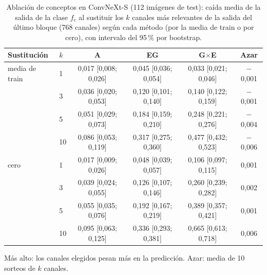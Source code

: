 \begin{table}
\centering
\scriptsize
\setlength{\tabcolsep}{3pt}
\caption{Ablación de conceptos en ConvNeXt-S (112 imágenes de test): caída media de la salida de la clase $f_c$ al sustituir los $k$ canales más relevantes de la salida del último bloque (768 canales) según cada método (por la media de train o por cero), con intervalo del 95\,\% por bootstrap.}
\label{tab:xai-ablacion}
\begin{tabular*}{\linewidth}{@{\extracolsep{\fill}}llcccc}
\toprule
Sustitución & $k$ & A & EG & G$\times$E & Azar \\
\midrule
media de train & 1 & 0{,}017 [0{,}008; 0{,}026] & 0{,}045 [0{,}036; 0{,}054] & 0{,}033 [0{,}021; 0{,}046] & $-$0{,}001 \\
 & 3 & 0{,}036 [0{,}020; 0{,}053] & 0{,}120 [0{,}101; 0{,}140] & 0{,}140 [0{,}122; 0{,}159] & $-$0{,}001 \\
 & 5 & 0{,}051 [0{,}029; 0{,}073] & 0{,}184 [0{,}159; 0{,}210] & 0{,}248 [0{,}221; 0{,}276] & $-$0{,}004 \\
 & 10 & 0{,}086 [0{,}053; 0{,}119] & 0{,}317 [0{,}275; 0{,}360] & 0{,}477 [0{,}432; 0{,}523] & $-$0{,}006 \\
\midrule
cero & 1 & 0{,}017 [0{,}009; 0{,}026] & 0{,}048 [0{,}039; 0{,}057] & 0{,}106 [0{,}097; 0{,}115] & 0{,}001 \\
 & 3 & 0{,}039 [0{,}024; 0{,}055] & 0{,}126 [0{,}107; 0{,}146] & 0{,}260 [0{,}239; 0{,}282] & 0{,}002 \\
 & 5 & 0{,}055 [0{,}035; 0{,}076] & 0{,}192 [0{,}167; 0{,}219] & 0{,}389 [0{,}357; 0{,}421] & 0{,}001 \\
 & 10 & 0{,}095 [0{,}063; 0{,}125] & 0{,}336 [0{,}293; 0{,}381] & 0{,}665 [0{,}613; 0{,}718] & 0{,}006 \\
\bottomrule
\end{tabular*}

\smallskip
\parbox{\linewidth}{\scriptsize Más alto: los canales elegidos pesan más en la predicción. Azar: media de 10 sorteos de $k$ canales.}
\end{table}
